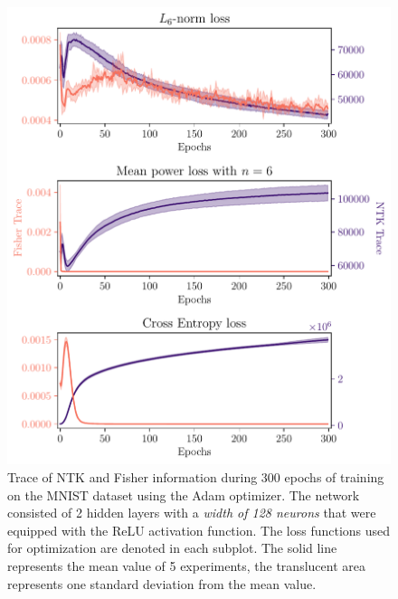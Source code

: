 \begin{figure}
	\centering
	\includegraphics[width=\textwidth]{text/results/FisherNTKComparisonPlots/Triple_comparison_losses6_128.pdf}
	\caption{Trace of NTK and Fisher information during 300 epochs of training on the MNIST dataset using the Adam optimizer. The network consisted of 2 hidden layers with a \emph{width of 128 neurons} that were equipped with the ReLU activation function. The loss functions used for optimization are denoted in each subplot. The solid line represents the mean value of 5 experiments, the translucent area represents one standard deviation from the mean value.}
	\label{fig:MNISTTraceComparison2}
\end{figure}
